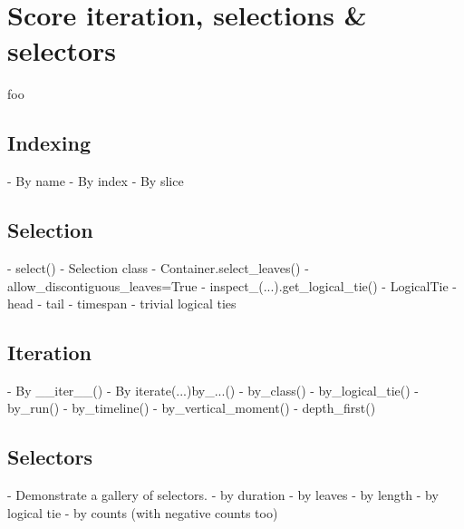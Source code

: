 \section{Score iteration, selections \& selectors}

foo

\subsection{Indexing}
\label{ssec:indexing}

\begin{markdown}
-   By name
-   By index
-   By slice
\end{markdown}

\subsection{Selection}
\label{ssec:selection}

\begin{markdown}
-   select() 
-   Selection class
-   Container.select_leaves()
    -   allow_discontiguous_leaves=True
-   inspect_(...).get_logical_tie() 
-   LogicalTie
    -   head
    -   tail
    -   timespan
    -   trivial logical ties
\end{markdown}

\subsection{Iteration}
\label{ssec:iteration}

\begin{markdown}
-   By __iter__()
-   By iterate(...)by_...()
    -   by_class()
    -   by_logical_tie()
    -   by_run()
    -   by_timeline()
    -   by_vertical_moment()
    -   depth_first()
\end{markdown}

\subsection{Selectors}
\label{ssec:selectors}

\begin{markdown}
-   Demonstrate a gallery of selectors.
    -   by duration
    -   by leaves
    -   by length
    -   by logical tie
    -   by counts (with negative counts too)
\end{markdown}

